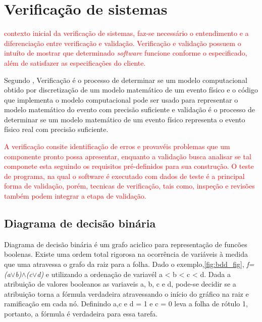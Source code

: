 \section{Verificação de sistemas}
\textcolor{red}{ contexto inicial da verificação de sistemas, faz-se necessário o entendimento e a diferenciação entre verificação e validação. Verificação e validação possuem o intuíto de mostrar que determinado \textit{software} funcione conforme o especificado, além de satisfazer as especificações do cliente\cite{sommerville2011engenharia}.} 

\par
Segundo \cite{sargent2005verification}, Verificação é o processo de determinar se um modelo computacional obtido por discretização de um modelo matemático de um evento físico e o código que implementa o modelo computacional pode ser usado para representar o modelo matemático do evento com precisão suficiente e validação é o processo de determinar se um modelo matemático de um evento físico representa o evento físico real com precisão suficiente.

\par
\textcolor{red}{A verificação consite identificação de erros e provavéis problemas que um componente pronto possa apresentar, enquanto a validação busca analisar se tal componete esta seguindo os requisitos pré-definidos para sua construção\cite{koscianski2007qualidade}. O teste de programa, na qual o software  é executado com dados de teste é a principal forma de validação, porém, tecnicas de verificação, tais como, inspeção e revisões também podem integrar a etapa de validação\cite{sommerville2011engenharia}.}

\subsection{Diagrama de decisão binária}
Diagrama de decisão binária é um grafo aciclico para representação de funcões boolenas. Existe uma ordem total rigorosa na ocorrência de variáveis à medida que uma atravessa o grafo da raiz para a folha. Dado o exemplo,\autoref{fig:bdd_fig}, \textit{f=(a$\lor$b)$\land$(c$\lor$d)} e utilizando a ordenação de variavél a < b < c < d. Dada a atribuição de valores booleanos as variaveis a, b, c e d, pode-se decidir se a atribuição torna a fórmula verdadeira atravessando o início do gráfico na raiz e ramificação em cada nó. Definindo a,c e d = 1 e c = 0 leva a folha de rótulo 1, portanto, a fórmula é verdadeira para essa tarefa\cite{clarke1994model}.

